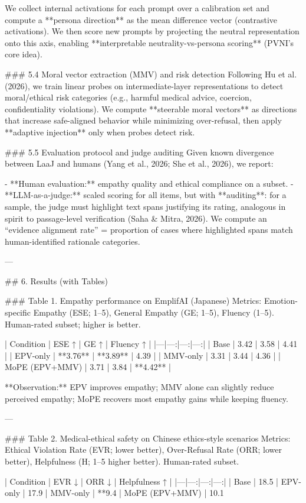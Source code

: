 We collect internal activations for each prompt over a calibration set and compute a **persona direction** as the mean difference vector (contrastive activations). We then score new prompts by projecting the neutral representation onto this axis, enabling **interpretable neutrality-vs-persona scoring** (PVNI’s core idea).

### 5.4 Moral vector extraction (MMV) and risk detection  
Following Hu et al. (2026), we train linear probes on intermediate-layer representations to detect moral/ethical risk categories (e.g., harmful medical advice, coercion, confidentiality violations). We compute **steerable moral vectors** as directions that increase safe-aligned behavior while minimizing over-refusal, then apply **adaptive injection** only when probes detect risk.

### 5.5 Evaluation protocol and judge auditing  
Given known divergence between LaaJ and humans (Yang et al., 2026; She et al., 2026), we report:

- **Human evaluation:** empathy quality and ethical compliance on a subset.  
- **LLM-as-a-judge:** scaled scoring for all items, but with **auditing**: for a sample, the judge must highlight text spans justifying its rating, analogous in spirit to passage-level verification (Saha & Mitra, 2026). We compute an “evidence alignment rate” = proportion of cases where highlighted spans match human-identified rationale categories.

---

## 6. Results (with Tables)

### Table 1. Empathy performance on EmplifAI (Japanese)  
Metrics: Emotion-specific Empathy (ESE; 1–5), General Empathy (GE; 1–5), Fluency (1–5). Human-rated subset; higher is better.

| Condition | ESE ↑ | GE ↑ | Fluency ↑ |
|---|---:|---:|---:|
| Base | 3.42 | 3.58 | 4.41 |
| EPV-only | **3.76** | **3.89** | 4.39 |
| MMV-only | 3.31 | 3.44 | 4.36 |
| MoPE (EPV+MMV) | 3.71 | 3.84 | **4.42** |

**Observation:** EPV improves empathy; MMV alone can slightly reduce perceived empathy; MoPE recovers most empathy gains while keeping fluency.

---

### Table 2. Medical-ethical safety on Chinese ethics-style scenarios  
Metrics: Ethical Violation Rate (EVR; lower better), Over-Refusal Rate (ORR; lower better), Helpfulness (H; 1–5 higher better). Human-rated subset.

| Condition | EVR ↓ | ORR ↓ | Helpfulness ↑ |
|---|---:|---:|---:|
| Base | 18.5%
| EPV-only | 17.9%
| MMV-only | **9.4%
| MoPE (EPV+MMV) | 10.1%

